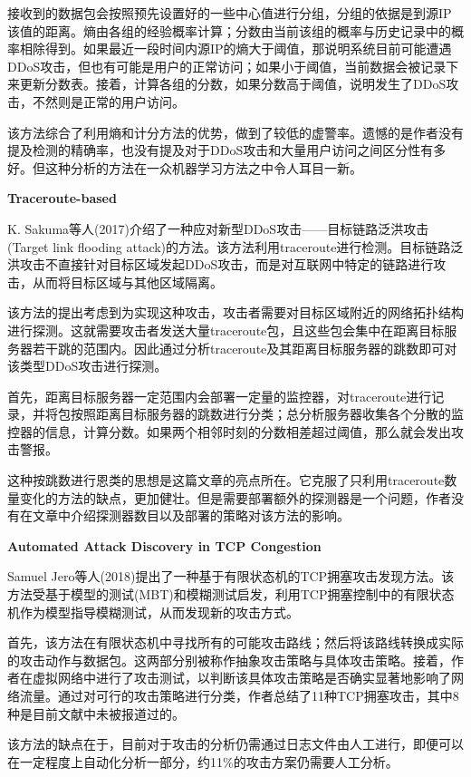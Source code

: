 \documentclass[11pt]{article} %
\begin{document}
接收到的数据包会按照预先设置好的一些中心值进行分组，分组的依据是到源IP该值的距离。熵由各组的经验概率计算；分数由当前该组的概率与历史记录中的概率相除得到。如果最近一段时间内源IP的熵大于阈值，那说明系统目前可能遭遇DDoS攻击，但也有可能是用户的正常访问；如果小于阈值，当前数据会被记录下来更新分数表。接着，计算各组的分数，如果分数高于阈值，说明发生了DDoS攻击，不然则是正常的用户访问。

该方法综合了利用熵和计分方法的优势，做到了较低的虚警率。遗憾的是作者没有提及检测的精确率，也没有提及对于DDoS攻击和大量用户访问之间区分性有多好。但这种分析的方法在一众机器学习方法之中令人耳目一新。

\textbf{Traceroute-based}

K. Sakuma等人(2017)介绍了一种应对新型DDoS攻击——目标链路泛洪攻击(Target link flooding attack)的方法。该方法利用traceroute进行检测。目标链路泛洪攻击不直接针对目标区域发起DDoS攻击，而是对互联网中特定的链路进行攻击，从而将目标区域与其他区域隔离。

该方法的提出考虑到为实现这种攻击，攻击者需要对目标区域附近的网络拓扑结构进行探测。这就需要攻击者发送大量traceroute包，且这些包会集中在距离目标服务器若干跳的范围内。因此通过分析traceroute及其距离目标服务器的跳数即可对该类型DDoS攻击进行探测。

首先，距离目标服务器一定范围内会部署一定量的监控器，对traceroute进行记录，并将包按照距离目标服务器的跳数进行分类；总分析服务器收集各个分散的监控器的信息，计算分数。如果两个相邻时刻的分数相差超过阈值，那么就会发出攻击警报。

这种按跳数进行恩类的思想是这篇文章的亮点所在。它克服了只利用traceroute数量变化的方法的缺点，更加健壮。但是需要部署额外的探测器是一个问题，作者没有在文章中介绍探测器数目以及部署的策略对该方法的影响。

\textbf{Automated Attack Discovery in TCP Congestion}

Samuel Jero等人(2018)提出了一种基于有限状态机的TCP拥塞攻击发现方法。该方法受基于模型的测试(MBT)和模糊测试启发，利用TCP拥塞控制中的有限状态机作为模型指导模糊测试，从而发现新的攻击方式。

首先，该方法在有限状态机中寻找所有的可能攻击路线；然后将该路线转换成实际的攻击动作与数据包。这两部分别被称作抽象攻击策略与具体攻击策略。接着，作者在虚拟网络中进行了攻击测试，以判断该具体攻击策略是否确实显著地影响了网络流量。通过对可行的攻击策略进行分类，作者总结了11种TCP拥塞攻击，其中8种是目前文献中未被报道过的。

该方法的缺点在于，目前对于攻击的分析仍需通过日志文件由人工进行，即便可以在一定程度上自动化分析一部分，约11\%的攻击方案仍需要人工分析。
\end{document}
